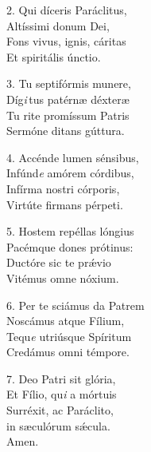 \begin{multicols}{2}
	\setlength{\parskip}{0.5em}
	2. Qui díceris Paráclitus,\\
	Altíssimi donum Dei,\\
	Fons vivus, ignis, cáritas\\
	Et spiritális únctio.

	3. Tu septifórmis munere,\\
	Díg{\it i}\,tus patérn\ae{} déxter\ae{}\\
	Tu rite promíssum Patris\\
	Sermóne ditans gúttura.

	4. Accénde lumen sénsibus,\\
	Infúnd{\it e} amórem córdibus,\\
	Infírma nostri córporis,\\
	Virtúte firmans pérpeti.

	5. Hostem repéllas lóngius\\
	Pacémque dones prótinus:\\
	Ductóre sic te pr\'{\ae}vio\\
	Vitémus omne nóxium.

	6. Per te sciámus da Patrem\\
	Noscámus atque Fílium,\\
	Tequ{\it e} utriúsque Spíritum\\
	Credámus omni témpore. 

	7. Deo Patri sit glória,\\
	Et Fílio, qu{\it i} a mórtuis\\
	Surréxit, ac Paráclito,\\
	in s\ae{}culórum s\'{\ae}cula.\\
	Amen.
\end{multicols}
